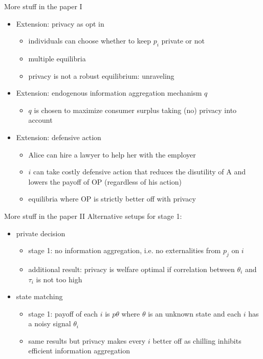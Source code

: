 \documentclass[bigger]{beamer}
\begin{document}
\begin{frame}[label={sec:orgcdf0799}]{More stuff in the paper I}
\begin{itemize}
\item Extension: privacy as opt in
\begin{itemize}
\item individuals can choose whether to keep \(p_i\) private or not
\item multiple equilibria
\item privacy is not a robust equilibrium: unraveling
\end{itemize}
\item Extension: endogenous information aggregation mechanism \(q\)
\begin{itemize}
\item \(q\) is chosen to maximize consumer surplus taking (no) privacy into account
\end{itemize}
\item Extension: defensive action
\begin{itemize}
\item Alice can hire a lawyer to help her with the employer
\item \(i\) can take costly defensive action that reduces the disutility of A and lowers the payoff of OP (regardless of his action)
\item equilibria where OP is strictly better off with privacy
\end{itemize}
\end{itemize}
\end{frame}
\begin{frame}[label={sec:org6c561d7}]{More stuff in the paper II}
Alternative setups for stage 1:
\begin{itemize}
\item private decision
\begin{itemize}
\item stage 1: no information aggregation, i.e. no externalities from \(p_j\) on \(i\)
\item additional result: privacy is welfare optimal if correlation between \(\theta_i\) and \(\tau_i\) is not too high
\end{itemize}
\item state matching
\begin{itemize}
\item stage 1: payoff of each \(i\) is \(p\theta\) where \(\theta\) is an unknown state and each \(i\) has a noisy signal \(\theta_i\)
\item same results but privacy makes every \(i\) better off as chilling inhibits efficient information aggregation
\end{itemize}
\end{itemize}
\end{frame}
\end{document}
